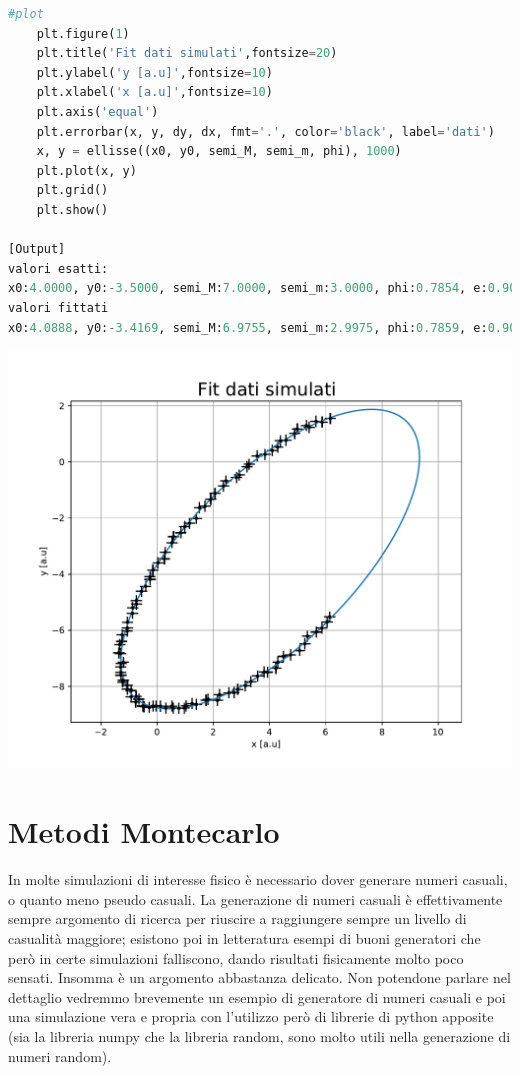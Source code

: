 \documentclass[10pt,a4paper]{article}
\begin{document}
\begin{lstlisting}[language=Python]
    #plot
    plt.figure(1)
    plt.title('Fit dati simulati',fontsize=20)
    plt.ylabel('y [a.u]',fontsize=10)
    plt.xlabel('x [a.u]',fontsize=10)
    plt.axis('equal')
    plt.errorbar(x, y, dy, dx, fmt='.', color='black', label='dati')
    x, y = ellisse((x0, y0, semi_M, semi_m, phi), 1000)
    plt.plot(x, y)
    plt.grid()
    plt.show()

[Output]
valori esatti:
x0:4.0000, y0:-3.5000, semi_M:7.0000, semi_m:3.0000, phi:0.7854, e:0.9035
valori fittati
x0:4.0888, y0:-3.4169, semi_M:6.9755, semi_m:2.9975, phi:0.7859, e:0.9030

\end{lstlisting}
\begin{center}
\includegraphics[scale=0.7]{img/fit_ellisse.pdf}
\end{center}





\newpage

\section{Metodi Montecarlo}
In molte simulazioni di interesse fisico è necessario dover generare numeri casuali, o quanto meno pseudo casuali. La generazione di numeri casuali è effettivamente sempre argomento di ricerca per riuscire a raggiungere sempre un livello di casualità maggiore; esistono poi in letteratura esempi di buoni generatori che però in certe simulazioni falliscono, dando risultati fisicamente molto poco sensati. Insomma è un argomento abbastanza delicato. Non potendone parlare nel dettaglio vedremmo brevemente un esempio di generatore di numeri casuali e poi una simulazione vera e propria con l'utilizzo però di librerie di python apposite (sia la libreria numpy che la libreria random, sono molto utili nella generazione di numeri random).
\end{document}
